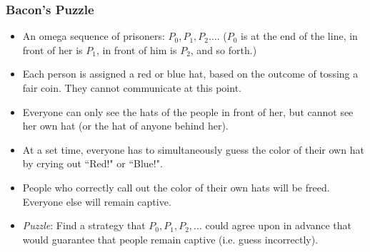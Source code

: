 \begin{frame}
\frametitle{Bacon's Puzzle}

\begin{itemize}[<+->]

\item An omega sequence of prisoners: \(P_0, P_1,P_2\dots\). (\(P_0\) is at the end of the line, in front of her is \(P_1\), in front of him is \(P_2\), and so forth.) 

\item Each person is assigned a red or blue hat, based on the outcome of tossing a fair coin. They cannot communicate at this point. 

\item Everyone can only see the hats of the people in front of her, but cannot see her own hat (or the hat of anyone behind her). 

\item At a set time, everyone has to simultaneously guess the color of their own hat by crying out ``Red!" or ``Blue!".

\item People who correctly call out the color of their own hats will be freed. Everyone else will remain captive. 

\item \emph{Puzzle}: Find a strategy that \(P_0, P_1,P_2, \ldots\) could agree upon in advance that would guarantee that  people remain captive (i.e. guess incorrectly). 

\end{itemize}
\end{frame}

